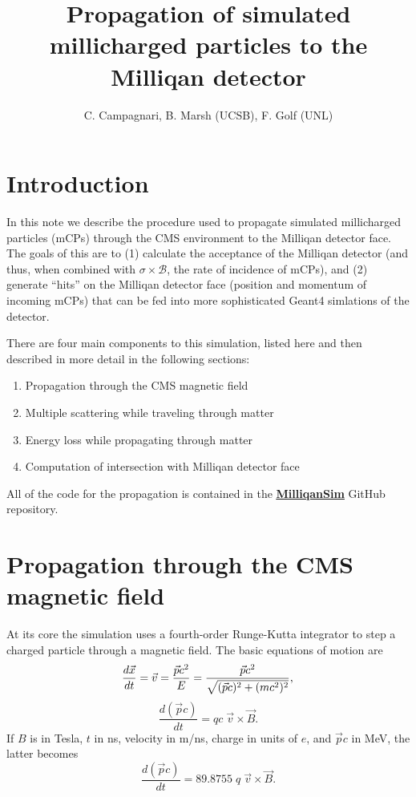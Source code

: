 \documentclass[12pt]{article}
\title{Propagation of simulated millicharged particles to the Milliqan detector}
\author{C. Campagnari, B. Marsh (UCSB), F. Golf (UNL)}
\begin{document}
\maketitle


\section{Introduction}
In this note we describe the procedure used to propagate simulated millicharged
particles (mCPs) through the CMS environment to the Milliqan detector face. The goals 
of this are to (1) calculate the acceptance of the Milliqan detector (and thus,
when combined with $\sigma\times\mathcal{B}$, the rate of incidence of mCPs),
and (2) generate ``hits'' on the Milliqan detector face  (position and momentum of incoming mCPs)
that can be fed into more sophisticated Geant4 simlations of the detector.

There are four main components to this simulation, listed here and then described in more
detail in the following sections:
\begin{enumerate}
\item Propagation through the CMS magnetic field
\item Multiple scattering while traveling through matter
\item Energy loss while propagating through matter
\item Computation of intersection with Milliqan detector face
\end{enumerate}

All of the code for the propagation is contained in the \href{https://github.com/bjmarsh/MilliqanSim}{\underline{\bf MilliqanSim}} GitHub repository.

\section{Propagation through the CMS magnetic field}
At its core the simulation uses a fourth-order Runge-Kutta integrator to step a charged particle
through a magnetic field. The basic equations of motion are
\begin{equation}\label{eq:dxdt}
\frac{d\vec{x}}{dt} = \vec{v} = \frac{\vec{p}c^2}{E} = \frac{\vec{p}c^2}{\sqrt{(\vec{p}c)^2+(mc^2)^2}}, \\
\end{equation}
\begin{equation}\label{eq:dpdt}
\frac{d(\vec{p}c)}{dt} = qc\;\vec{v}\times\vec{B}.
\end{equation}
If $B$ is in Tesla, $t$ in ns, velocity in m/ns, charge in units of $e$, and $\vec{p}c$ in MeV, the latter becomes
\begin{equation}\label{eq:dpdt_mod}
\frac{d(\vec{p}c)}{dt} = 89.8755\;q\;\vec{v}\times\vec{B}.
\end{equation}
\end{document}
